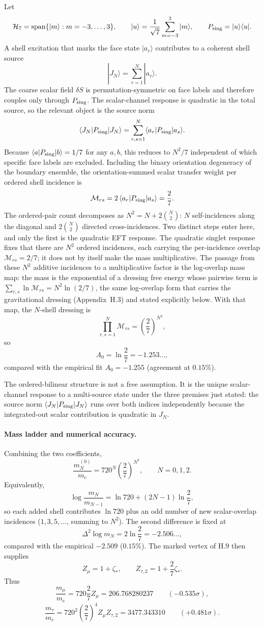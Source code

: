\documentclass[11pt]{article}
\begin{document}
Let
\[
\mathcal H_7=\mathrm{span}\{|m\rangle:m=-3,\ldots,3\},
\qquad
|u\rangle=\frac{1}{\sqrt 7}\sum_{m=-3}^{3}|m\rangle,
\qquad
P_{\rm sing}=|u\rangle\langle u|.
\]
A shell excitation that marks the face state $|a_r\rangle$ contributes to a coherent shell source
\[
|J_N\rangle=\sum_{r=1}^{N}|a_r\rangle.
\]
The coarse scalar field $\delta S$ is permutation-symmetric on face labels and therefore couples only through $P_{\rm sing}$. The scalar-channel response is quadratic in the total source, so the relevant object is the source norm
\[
\langle J_N|P_{\rm sing}|J_N\rangle
=
\sum_{r,s=1}^{N}\langle a_r|P_{\rm sing}|a_s\rangle.
\]
Because $\langle a|P_{\rm sing}|b\rangle=1/7$ for any $a,b$, this reduces to $N^2/7$ independent of which specific face labels are excluded. Including the binary orientation degeneracy of the boundary ensemble, the orientation-summed scalar transfer weight per ordered shell incidence is
\[
\mathcal M_{rs}=2\,\langle a_r|P_{\rm sing}|a_s\rangle=\frac{2}{7}.
\]
The ordered-pair count decomposes as $N^2=N+2\binom{N}{2}$: $N$ self-incidences along the diagonal and $2\binom{N}{2}$ directed cross-incidences. Two distinct steps enter here, and only the first is the quadratic EFT response. The quadratic singlet response fixes that there are $N^2$ ordered incidences, each carrying the per-incidence overlap $\mathcal M_{rs}=2/7$; it does not by itself make the mass multiplicative. The passage from these $N^2$ additive incidences to a multiplicative factor is the log-overlap mass map: the mass is the exponential of a dressing free energy whose pairwise term is $\sum_{r,s}\ln\mathcal M_{rs}=N^2\ln(2/7)$, the same log-overlap form that carries the gravitational dressing (Appendix~H.3) and stated explicitly below. With that map, the $N$-shell dressing is
\[
\prod_{r,s=1}^{N}\mathcal M_{rs}=\left(\frac{2}{7}\right)^{N^2},
\]
so
\[
A_0=\ln\frac{2}{7}=-1.253\ldots,
\]
compared with the empirical fit $A_0=-1.255$ (agreement at $0.15\%$).

The ordered-bilinear structure is not a free assumption. It is the unique scalar-channel response to a multi-source state under the three premises just stated: the source norm $\langle J_N|P_{\rm sing}|J_N\rangle$ runs over both indices independently because the integrated-out scalar contribution is quadratic in $J_N$.

\paragraph{Mass ladder and numerical accuracy.}
Combining the two coefficients,
\[
\boxed{
\frac{m_N^{(0)}}{m_e}=720^N\left(\frac{2}{7}\right)^{N^2},
\qquad N=0,1,2.
}
\]
Equivalently,
\[
\log\frac{m_N}{m_{N-1}}=\ln 720+(2N-1)\ln\frac{2}{7},
\]
so each added shell contributes $\ln 720$ plus an odd number of new scalar-overlap incidences ($1,3,5,\ldots$, summing to $N^2$). The second difference is fixed at
\[
\Delta^2\log m_N=2\ln\frac{2}{7}=-2.506\ldots,
\]
compared with the empirical $-2.509$ ($0.15\%$). The marked vertex of H.9 then supplies
\[
Z_\mu=1+\zeta_*,
\qquad
Z_{\tau,2}=1+\frac27\zeta_*.
\]
Thus
\[
\frac{m_\mu}{m_e}
=720\frac27Z_\mu
=206.768280237
\qquad(-0.535\sigma),
\]
\[
\frac{m_\tau}{m_e}
=720^2\left(\frac27\right)^4Z_\mu Z_{\tau,2}
=3477.343310
\qquad(+0.481\sigma).
\]
\end{document}
